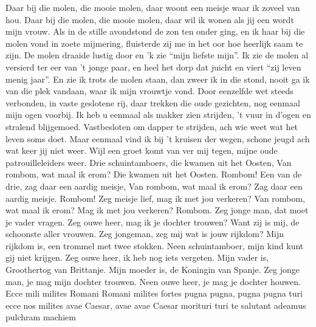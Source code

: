 \documentclass{article}
\begin{document}
\begin{songs}{}
\endverse
\beginchorus
Daar bij die molen, die mooie molen,
daar woont een meisje waar ik zoveel van hou.
Daar bij die molen, die mooie molen,
daar wil ik wonen als jij een wordt mijn vrouw.
\endchorus
\beginverse
Als in de stille avondstond de zon ten onder ging,
en ik haar bij die molen vond in zoete mijmering,
fluisterde zij me in het oor hoe heerlijk saam te zijn.
De molen draaide lustig door en 'k zie “mijn liefste mijn”.
\endverse
\beginverse
Ik zie de molen al versierd ter eer van 't jonge paar,
en heel het dorp dat juicht en viert “zij leven menig jaar”.
En zie ik trots de molen staan, dan zweer ik in die stond,
nooit ga ik van die plek vandaan, waar ik mijn vrouwtje vond.
\endverse
\endsong
{}
\beginverse*
Door eenzelfde wet steeds verbonden,
in vaste geslotene rij,
daar trekken die oude gezichten,
nog eenmaal mijn ogen voorbij.
Ik heb u eenmaal als makker zien strijden,
't vuur in d’ogen en stralend blijgemoed.
Vastbesloten om dapper te strijden,
ach wie weet wat het leven soms doet.
Maar eenmaal vind ik bij 't kruisen der wegen,
schone jeugd ach wat keer jij niet weer.
Wijl een groet komt van ver mij tegen,
mijne oude patrouilleleiders weer.
\endverse
\endsong
{}
\beginverse
Drie schuintamboers, die kwamen uit het Oosten, 
Van rombom, wat maal ik erom?
Die kwamen uit het Oosten.
Rombom!
\endverse
\beginverse
Een van de drie, zag daar een aardig meisje, 
Van rombom, wat maal ik erom?
Zag daar een aardig meisje.
Rombom!
\endverse
\beginverse
Zeg meisje lief, mag ik met jou verkeren? 
Van rombom, wat maal ik erom?
Mag ik met jou verkeren?
Rombom.
\endverse
\beginverse
Zeg jonge man, dat moet je vader vragen.
\endverse
\beginverse
Zeg ouwe heer, mag ik je dochter trouwen?
\endverse
\beginverse
Want zij is mij, de schoonste aller vrouwen.
\endverse
\beginverse
Zeg jongeman, zeg mij wat is jouw rijkdom?
\endverse
\beginverse
Mijn rijkdom is, een trommel met twee stokken.
\endverse
\beginverse
Neen schuintamboer, mijn kind kunt gij niet krijgen.
\endverse
\beginverse
Zeg ouwe heer, ik heb nog iets vergeten.
\endverse
\beginverse
Mijn vader is, Groothertog van Brittanje.
\endverse
\beginverse
Mijn moeder is, de Koningin van Spanje.
\endverse
\beginverse
Zeg jonge man, je mag mijn dochter trouwen.
\endverse
\beginverse
Neen ouwe heer, je mag je dochter houwen.
\endverse
\endsong
{}
\beginverse*
Ecce mili milites Romani
Romani milites fortes
pugna pugna, pugna pugna turi
ecce nos milites 
avae Caesar, avae avae Caesar
morituri turi te salutant
adeamus pulchram machiem

\end{songs}
\end{document}
